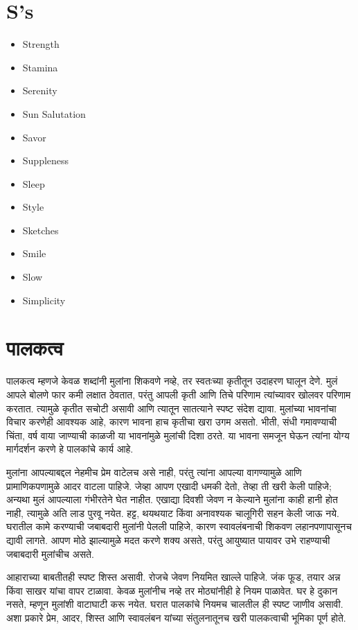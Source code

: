 \section*{S’s}
\begin{itemize}
\item Strength
\item Stamina
\item Serenity
\item Sun Salutation 
\item Savor
\item Suppleness
\item Sleep 
\item Style
\item Sketches
\item Smile
\item Slow 
\item Simplicity
\end{itemize}

\section*{पालकत्व}

पालकत्व म्हणजे केवळ शब्दांनी मुलांना शिकवणे नव्हे, तर स्वतःच्या कृतीतून उदाहरण घालून देणे. मुलं आपले बोलणे फार कमी लक्षात ठेवतात, परंतु आपली कृती आणि तिचे परिणाम त्यांच्यावर खोलवर परिणाम करतात. त्यामुळे कृतीत सचोटी असावी आणि त्यातून सातत्याने स्पष्ट संदेश द्यावा. मुलांच्या भावनांचा विचार करणेही आवश्यक आहे, कारण भावना हाच कृतीचा खरा उगम असतो. भीती, संधी गमावण्याची चिंता, वर्ष वाया जाण्याची काळजी या भावनांमुळे मुलांची दिशा ठरते. या भावना समजून घेऊन त्यांना योग्य मार्गदर्शन करणे हे पालकांचे कार्य आहे.

मुलांना आपल्याबद्दल नेहमीच प्रेम वाटेलच असे नाही, परंतु त्यांना आपल्या वागण्यामुळे आणि प्रामाणिकपणामुळे आदर वाटला पाहिजे. जेव्हा आपण एखादी धमकी देतो, तेव्हा ती खरी केली पाहिजे; अन्यथा मुलं आपल्याला गंभीरतेने घेत नाहीत. एखाद्या दिवशी जेवण न केल्याने मुलांना काही हानी होत नाही, त्यामुळे अति लाड पुरवू नयेत. हट्ट, थयथयाट किंवा अनावश्यक चालूगिरी सहन केली जाऊ नये. घरातील कामे करण्याची जबाबदारी मुलांनी पेलली पाहिजे, कारण स्वावलंबनाची शिकवण लहानपणापासूनच द्यावी लागते. आपण मोठे झाल्यामुळे मदत करणे शक्य असते, परंतु आयुष्यात पायावर उभे राहण्याची जबाबदारी मुलांचीच असते.

आहाराच्या बाबतीतही स्पष्ट शिस्त असावी. रोजचे जेवण नियमित खाल्ले पाहिजे. जंक फूड, तयार अन्न किंवा साखर यांचा वापर टाळावा. केवळ मुलांनीच नव्हे तर मोठ्यांनीही हे नियम पाळावेत. घर हे दुकान नसते, म्हणून मुलांशी वाटाघाटी करू नयेत. घरात पालकांचे नियमच चालतील ही स्पष्ट जाणीव असावी. अशा प्रकारे प्रेम, आदर, शिस्त आणि स्वावलंबन यांच्या संतुलनातूनच खरी पालकत्वाची भूमिका पूर्ण होते.

